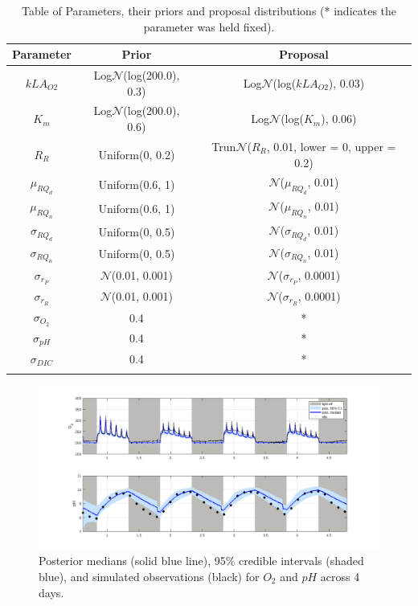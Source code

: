 \documentclass{ruthesis}
\begin{document}
\begin{longtable}{|c | c  |  c|}
	\hline
	\bfseries{Parameter} & \bfseries{Prior} &  \bfseries{Proposal} \\ \hline
	$kLA_{O2}$  & Log$\mathcal{N}$(log(200.0), 0.3)  & Log$\mathcal{N}$(log($kLA_{O2}$), 0.03) \\
	$K_m$ 		&  Log$\mathcal{N}$(log(200.0), 0.6) & Log$\mathcal{N}$(log($K_m$), 0.06) \\
	$R_R$  		& Uniform(0, 0.2) &  Trun$\mathcal{N}$($R_R$, 0.01, lower = 0, upper = 0.2) \\
	$\mu_{RQ_d}$  	& Uniform(0.6, 1) &  $\mathcal{N}$($\mu_{RQ_d}$, 0.01)\\
	$\mu_{RQ_n}$  	& Uniform(0.6, 1) &  $\mathcal{N}$($\mu_{RQ_n}$, 0.01)\\
	$\sigma_{RQ_d}$ & Uniform(0, 0.5) &  $\mathcal{N}$($\sigma_{RQ_d}$, 0.01)\\
	$\sigma_{RQ_n}$ & Uniform(0, 0.5) &  $\mathcal{N}$($\sigma_{RQ_n}$, 0.01)\\
	$\sigma_{r_P}$ & $\mathcal{N}$(0.01, 0.001)   & $\mathcal{N}$($\sigma_{r_P}$, 0.0001)   \\
	$\sigma_{r_R}$ & $\mathcal{N}$(0.01, 0.001)   & $\mathcal{N}$($\sigma_{r_R}$, 0.0001)   \\
	$\sigma_{O_2}$ 	& 0.4	& *  \\
	$\sigma_{pH}$ 	& 0.4 	& * \\
	$\sigma_{DIC}$ 	& 0.4	& * \\
	\hline	
	\caption[.]{Table of Parameters, their priors and proposal distributions (* indicates the parameter was held fixed).}
\end{longtable}




\begin{figure}
	\centerline{\includegraphics[width=1.2\textwidth]{images_microalgae/plots_iterative/O2_pH}}
	\caption[.]{Posterior medians (solid blue line), 95\% credible intervals (shaded blue), and simulated observations (black) for $O_2$ and $pH$ across 4 days.}
	\label{fig:micro_exp_iterative_O2_pH}
\end{figure}
\end{document}
